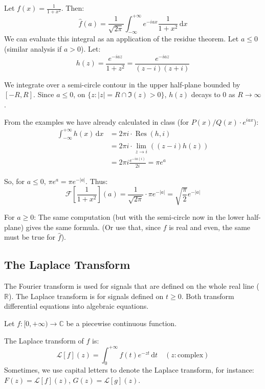 Let $f(x) = \frac{1}{1 + x^2}$. Then:
\begin{equation*}
    \hat{f}(a) = \frac{1}{\sqrt{2\pi}} \int_{-\infty}^{+\infty} e^{-iax} \frac{1}{1 + x^2} \,\mathrm{d}x
\end{equation*}
We can evaluate this integral as an application of the residue theorem. 
Let $a \le 0$ (similar analysis if $a > 0$). Let:
\begin{equation*}
    h(z) = \frac{e^{-iaz}}{1 + z^2} = \frac{e^{-iaz}}{(z - i)(z + i)}
\end{equation*}

We integrate over a semi-circle contour in the upper half-plane bounded by $[-R, R]$.
Since $a \le 0$, on $\{z : |z| = R \cap \Im(z) > 0\}$, $h(z)$ decays to $0$ as $R \to \infty$. 

From the examples we have already calculated in class (for $P(x)/Q(x) \cdot e^{iax}$):
\begin{align*}
    \int_{-\infty}^{+\infty} h(x) \,\mathrm{d}x &= 2\pi i \cdot \operatorname{Res}(h, i) \\
    &= 2\pi i \cdot \lim_{z \to i} \left( (z - i)h(z) \right) \\
    &= 2\pi i \frac{e^{-ia(i)}}{2i} = \pi e^a
\end{align*}

So, for $a \le 0$, $\pi e^a = \pi e^{-|a|}$. Thus:
\begin{equation*}
    \mathcal{F}\left[\frac{1}{1+x^2}\right](a) = \frac{1}{\sqrt{2\pi}} \cdot \pi e^{-|a|} = \sqrt{\frac{\pi}{2}} e^{-|a|}
\end{equation*}

For $a \ge 0$: The same computation (but with the semi-circle now in the lower half-plane) gives the same formula. (Or use that, since $f$ is real and even, the same must be true for $\hat{f}$).


\subsection{The Laplace Transform}

The Fourier transform is used for signals that are defined on the whole real line ($\mathbb{R}$). The Laplace transform is for signals defined on $t \ge 0$. Both transform differential equations into algebraic equations.

Let $f: [0, +\infty) \to \mathbb{C}$ be a piecewise continuous function.

\begin{definition}
The Laplace transform of $f$ is:
\begin{equation}
    \mathcal{L}[f](z) = \int_0^{+\infty} f(t) e^{-zt} \,\mathrm{d}t \quad (z: \text{complex})
\end{equation}
Sometimes, we use capital letters to denote the Laplace transform, for instance: $F(z) = \mathcal{L}[f](z)$, $G(z) = \mathcal{L}[g](z)$.
\end{definition}

